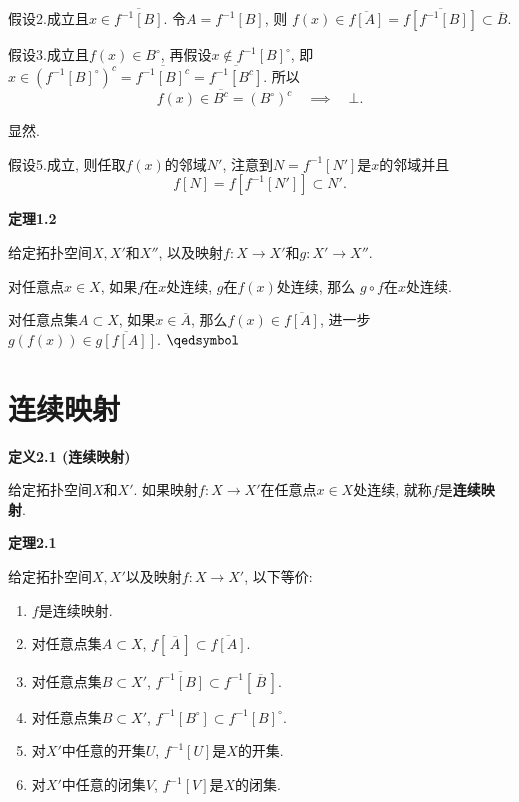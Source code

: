 \documentclass[UTF8]{ctexart}
\begin{document}
假设2.成立且$x\in\overline{f^{-1}[B]}$. 令$A=f^{-1}[B]$, 则
$f(x)\in\overline{f[A]}=\overline{f[f^{-1}[B]]}\subset\overline{B}$.


假设3.成立且$f(x)\in B^\circ$, 再假设$x\notin f^{-1}[B]^\circ$,
即$x\in(f^{-1}[B]^\circ)^c=\overline{f^{-1}[B]^c}=\overline{f^{-1}[B^c]}$. 所以
\[
    f(x)\in\overline{B^c}=(B^\circ)^c\quad\implies\quad\bot.
\]

 显然.


假设5.成立, 则任取$f(x)$的邻域$N'$, 注意到$N=f^{-1}[N']$是$x$的邻域并且
\begin{equation*}
    f[N]=f[f^{-1}[N']]\subset N'.
\tag*{\qedsymbol}\end{equation*}

\vspace{10pt}

\hypertarget{sec:定理1.2}{}
\noindent\textbf{定理1.2}

给定拓扑空间$X,X'$和$X''$, 以及映射$f:X\to X'$和$g:X'\to X''$.

对任意点$x\in X$, 如果$f$在$x$处连续, $g$在$f(x)$处连续, 那么
$g\circ f$在$x$处连续.


对任意点集$A\subset X$, 如果$x\in\overline{A}$,
那么$f(x)\in\overline{f[A]}$, 进一步$g(f(x))\in\overline{g[f[A]]}$.
\hfill $\qedsymbol$





\newpage

\section{连续映射}

\hypertarget{sec:定义2.1}{}
\noindent\textbf{定义2.1 (连续映射)}

给定拓扑空间$X$和$X'$.
如果映射$f:X\to X'$在任意点$x\in X$处连续, 就称$f$是\textbf{连续映射}.

\vspace{10pt}

\hypertarget{sec:定理2.1}{}
\noindent\textbf{定理2.1}

给定拓扑空间$X,X'$以及映射$f:X\to X'$, 以下等价:
\begin{enumerate}
    \item $f$是连续映射.
    \item 对任意点集$A\subset X$, $f[\,\overline{A}\,]\subset\overline{f[A]}$.
    \item 对任意点集$B\subset X'$,
    $\overline{f^{-1}[B]}\subset f^{-1}[\,\overline{B}\,]$.
    \item 对任意点集$B\subset X'$,
    $f^{-1}[B^\circ]\subset f^{-1}[B]^\circ$.
    \item 对$X'$中任意的开集$U$, $f^{-1}[U]$是$X$的开集.
    \item 对$X'$中任意的闭集$V$, $f^{-1}[V]$是$X$的闭集.
\end{enumerate}
\end{document}
